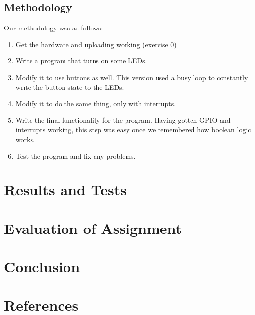 \documentclass[a4paper, 12pt]{article}
\begin{document}
    \subsection{Methodology} %
    \label{sub:methodology}
        Our methodology was as follows:
        \begin{enumerate}
            \item Get the hardware and uploading working (exercise 0)
            \item Write a program that turns on some LEDs.
            \item Modify it to use buttons as well. This version used a busy loop to constantly write the button state to the LEDs.
            \item Modify it to do the same thing, only with interrupts.
            \item Write the final functionality for the program. Having gotten GPIO and interrupts working, this step was easy once we remembered how boolean logic works.
            \item Test the program and fix any problems.
        \end{enumerate}

\section{Results and Tests} %
\label{sec:results_and_tests}


\section{Evaluation of Assignment} %
\label{sec:evaluation_of_assignment}


\section{Conclusion} %
\label{sec:conclusion}


\section{References} %
\label{sec:references}

\end{document}
